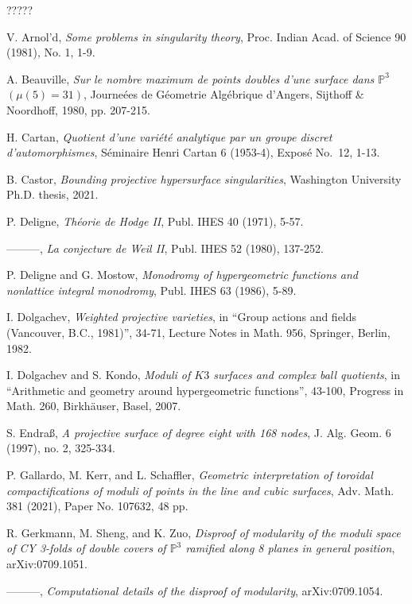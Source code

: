 \documentclass[12pt,letterpaper,english]{amsart}
\numberwithin{equation}{section}
\numberwithin{figure}{section}
\theoremstyle{plain}
\theoremstyle{remark}
\theoremstyle{definition}
\theoremstyle{definition}
\theoremstyle{plain}
\theoremstyle{plain}
\theoremstyle{plain}
\theoremstyle{plain}
\theoremstyle{definition}
\def\PP{\mathbb{P}}
\theoremstyle{definition}
\begin{document}
\begin{thebibliography}{?????}

 V. Arnol'd, \emph{Some problems in singularity theory}, Proc. Indian Acad. of Science 90 (1981), No. 1, 1-9.

 A. Beauville, \emph{Sur le nombre maximum de points doubles d'une surface dans $\PP^3$ $(\mu(5)=31)$}, Journe\'ees de G\'eometrie Alg\'ebrique d'Angers, Sijthoff \& Noordhoff, 1980, pp. 207-215.

 H. Cartan, \emph{Quotient d'une vari\'et\'e analytique par un groupe discret d'automorphismes}, S\'eminaire Henri Cartan 6 (1953-4), Expos\'e No.~12, 1-13.

 B. Castor, \emph{Bounding projective hypersurface singularities}, Washington University Ph.D. thesis, 2021.

 P. Deligne, \emph{Th\'eorie de Hodge II}, Publ. IHES 40 (1971), 5-57.

 ---------, \emph{La conjecture de Weil II}, Publ. IHES 52 (1980), 137-252.

 P. Deligne and G. Mostow, \emph{Monodromy of hypergeometric functions and nonlattice integral monodromy}, Publ. IHES 63 (1986), 5-89.

 I. Dolgachev, \emph{Weighted projective varieties}, in ``Group actions and fields (Vancouver, B.C., 1981)'', 34-71, Lecture Notes in Math. 956, Springer, Berlin, 1982.

 I. Dolgachev and S. Kondo, \emph{Moduli of $K3$ surfaces and complex ball quotients}, in ``Arithmetic and geometry around hypergeometric functions'', 43-100, Progress in Math. 260, Birkh\"auser, Basel, 2007.

 S. Endra\ss, \emph{A projective surface of degree eight with 168 nodes}, J. Alg. Geom. 6 (1997), no. 2, 325-334.

 P. Gallardo, M. Kerr, and L. Schaffler, \emph{Geometric interpretation of toroidal compactifications of moduli of points in the line and cubic surfaces}, Adv. Math. 381 (2021), Paper No. 107632, 48 pp.

 R. Gerkmann, M. Sheng, and K. Zuo, \emph{Disproof of modularity of the moduli space of CY 3-folds of double covers of $\PP^3$ ramified along 8 planes in general position}, arXiv:0709.1051.


 ---------, \emph{Computational details of the disproof of modularity}, arXiv:0709.1054.


\end{thebibliography}
\end{document}
